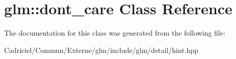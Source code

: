 \hypertarget{classglm_1_1dont__care}{}\section{glm\+:\+:dont\+\_\+care Class Reference}
\label{classglm_1_1dont__care}


The documentation for this class was generated from the following file\+:\begin{DoxyCompactItemize}
\item 
Cadriciel/\+Commun/\+Externe/glm/include/glm/detail/hint.\+hpp\end{DoxyCompactItemize}
